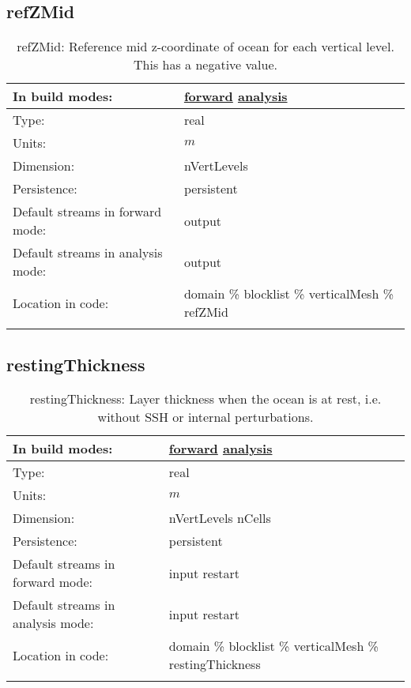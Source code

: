 \subsection[refZMid]{refZMid}
\label{subsec:var_sec_verticalMesh_refZMid}
\begin{center}
\begin{longtable}{| p{2.0in} | p{4.0in} |}
        \hline 
        In build modes: & \hyperref[subsec:forward_var_tab_verticalMesh]{forward} \hyperref[subsec:analysis_var_tab_verticalMesh]{analysis} \\
        \hline 
        Type: & real \\
        \hline 
        Units: & $m$ \\
        \hline 
        Dimension: & nVertLevels \\
        \hline 
        Persistence: & persistent \\
        \hline 
		 Default streams in forward mode: &  output \\
        \hline 
		 Default streams in analysis mode: &  output \\
        \hline 
		 Location in code: & domain \% blocklist \% verticalMesh \% refZMid \\
		 \hline 
    \caption{refZMid: Reference mid z-coordinate of ocean for each vertical level.  This has a negative value.}
\end{longtable}
\end{center}
\subsection[restingThickness]{restingThickness}
\label{subsec:var_sec_verticalMesh_restingThickness}
\begin{center}
\begin{longtable}{| p{2.0in} | p{4.0in} |}
        \hline 
        In build modes: & \hyperref[subsec:forward_var_tab_verticalMesh]{forward} \hyperref[subsec:analysis_var_tab_verticalMesh]{analysis} \\
        \hline 
        Type: & real \\
        \hline 
        Units: & $m$ \\
        \hline 
        Dimension: & nVertLevels nCells \\
        \hline 
        Persistence: & persistent \\
        \hline 
		 Default streams in forward mode: &  input restart \\
        \hline 
		 Default streams in analysis mode: &  input restart \\
        \hline 
		 Location in code: & domain \% blocklist \% verticalMesh \% restingThickness \\
		 \hline 
    \caption{restingThickness: Layer thickness when the ocean is at rest, i.e. without SSH or internal perturbations.}
\end{longtable}
\end{center}
